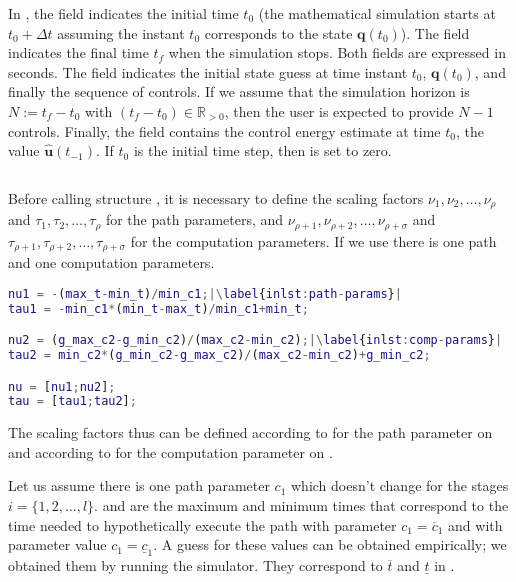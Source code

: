 In , the field  indicates the initial time $t_0$ (the mathematical simulation starts at $t_0+\Delta t$ assuming the instant $t_0$ corresponds to the state $\mathbf{q}(t_0)$). The field  indicates the final time $t_f$ when the simulation stops. Both fields are expressed in seconds. The field  indicates the initial state guess at time instant $t_0$, $\mathbf{q}(t_0)$, and finally  the sequence of controls. If we assume that the simulation horizon is $N:=t_f-t_0$ with $(t_f-t_0)\in\mathbb{R}_{>0}$, then the user is expected to provide $N-1$ controls. Finally, the field  contains the control energy estimate at time $t_0$, the value $\hat{\mathbf{u}}(t_{-1})$. If $t_0$ is the initial time step, then  is set to zero.  

\begin{lstlisting}[language=Matlab,caption={Runge-Kutta fourth order method for numerical integration of the model.},captionpos=b,label=lst:rk4]
% TODO
\end{lstlisting}

Before calling structure , it is necessary to define the scaling factors $\nu_1,\nu_2,\dots,\nu_{\rho}$ and $\tau_1,\tau_2,\dots,\tau_{\rho}$ for the path parameters, and $\nu_{\rho+1},\nu_{\rho+2},\dots,\nu_{\rho+\sigma}$ and $\tau_{\rho+1},\tau_{\rho+2},\dots,\tau_{\rho+\sigma}$ for the computation parameters. If we use  there is one path and one computation parameters. 

\begin{lstlisting}[language=Matlab,caption={[Implementation of path and computation parameters scaling factors]Implementation of path and computation parameters scaling factors.},captionpos=b,label=lst:nu_tau,escapechar=|]
nu1 = -(max_t-min_t)/min_c1;|\label{inlst:path-params}|
tau1 = -min_c1*(min_t-max_t)/min_c1+min_t;

nu2 = (g_max_c2-g_min_c2)/(max_c2-min_c2);|\label{inlst:comp-params}|
tau2 = min_c2*(g_min_c2-g_max_c2)/(max_c2-min_c2)+g_min_c2;

nu = [nu1;nu2];
tau = [tau1;tau2];
\end{lstlisting}

The scaling factors thus can be defined according to  for the path parameter on  and according to  for the computation parameter on .

Let us assume there is one path parameter $c_1$ which doesn't change for the stages $i=\{1,2,\dots,l\}$.  and  are the maximum and minimum times that correspond to the time needed to hypothetically execute the path with parameter $c_1=\overline{c}_1$ and with parameter value $c_1=\underline{c}_1$. A guess for these values can be obtained empirically; we obtained them by running the simulator. They correspond to $\overline{t}$ and $\underline{t}$ in .

